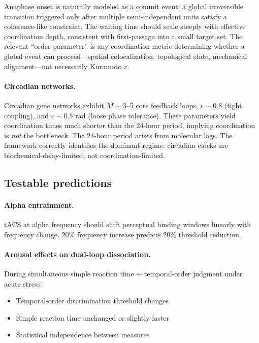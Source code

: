 \documentclass[12pt]{article}
\begin{document}
Anaphase onset is naturally modeled as a commit event: a global irreversible transition triggered only after multiple semi-independent units satisfy a coherence-like constraint. The waiting time should scale steeply with effective coordination depth, consistent with first-passage into a small target set. The relevant ``order parameter'' is any coordination metric determining whether a global event can proceed---spatial colocalization, topological state, mechanical alignment---not necessarily Kuramoto $r$.

\paragraph{Circadian networks.} Circadian gene networks exhibit $M \sim 3$--5 core feedback loops, $r \sim 0.8$ (tight coupling), and $\varepsilon \sim 0.5$ rad (loose phase tolerance). These parameters yield coordination times much shorter than the 24-hour period, implying coordination is \emph{not} the bottleneck. The 24-hour period arises from molecular lags. The framework correctly identifies the dominant regime: circadian clocks are biochemical-delay-limited, not coordination-limited.

\subsection{Testable predictions}

\paragraph{Alpha entrainment.}
tACS at alpha frequency should shift perceptual binding windows linearly with frequency change. 20\% frequency increase predicts 20\% threshold reduction.

\paragraph{Arousal effects on dual-loop dissociation.}
During simultaneous simple reaction time + temporal-order judgment under acute stress:
\begin{itemize}
\item Temporal-order discrimination threshold changes
\item Simple reaction time unchanged or slightly faster
\item Statistical independence between measures
\end{itemize}
\end{document}
